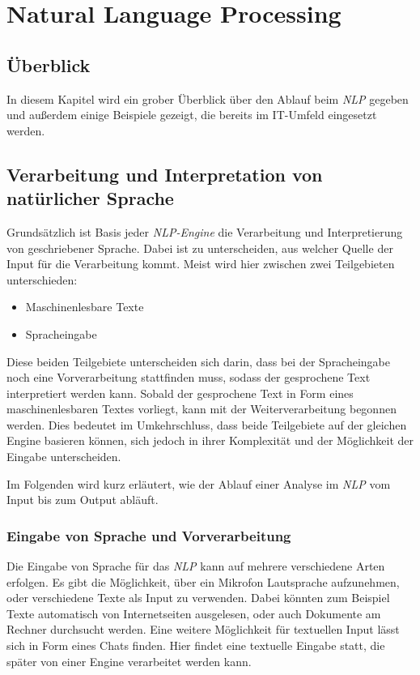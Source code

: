 \chapter{Natural Language Processing}
\label{cha:NaturalLanguageProcessing}
\section{Überblick}
In diesem Kapitel wird ein grober Überblick über den Ablauf beim \textit{NLP} gegeben und außerdem einige Beispiele gezeigt, die bereits im IT-Umfeld eingesetzt werden. 

\section{Verarbeitung und Interpretation von natürlicher Sprache}
\label{sec:applications-natural-language-processing}
Grundsätzlich ist Basis jeder \textit{NLP-Engine} die Verarbeitung und Interpretierung von geschriebener Sprache. Dabei ist zu unterscheiden, aus welcher Quelle der Input für die Verarbeitung kommt. Meist wird hier zwischen zwei Teilgebieten unterschieden:

\begin{itemize}
	\item Maschinenlesbare Texte
	\item Spracheingabe
\end{itemize}

Diese beiden Teilgebiete unterscheiden sich darin, dass bei der Spracheingabe noch eine Vorverarbeitung stattfinden muss, sodass der gesprochene Text interpretiert werden kann. Sobald der gesprochene Text in Form eines maschinenlesbaren Textes vorliegt, kann mit der Weiterverarbeitung begonnen werden. Dies bedeutet im Umkehrschluss, dass beide Teilgebiete auf der gleichen Engine basieren können, sich jedoch in ihrer Komplexität und der Möglichkeit der Eingabe unterscheiden. 

Im Folgenden wird kurz erläutert, wie der Ablauf einer Analyse im \textit{NLP} vom Input bis zum Output abläuft. 

\subsection{Eingabe von Sprache und Vorverarbeitung}
Die Eingabe von Sprache für das \textit{NLP} kann auf mehrere verschiedene Arten erfolgen. Es gibt die Möglichkeit, über ein Mikrofon Lautsprache aufzunehmen, oder verschiedene Texte als Input zu verwenden. Dabei könnten zum Beispiel Texte automatisch von Internetseiten ausgelesen, oder auch Dokumente am Rechner durchsucht werden. Eine weitere Möglichkeit für textuellen Input lässt sich in Form eines Chats finden. Hier findet eine textuelle Eingabe statt, die später von einer Engine verarbeitet werden kann. 

